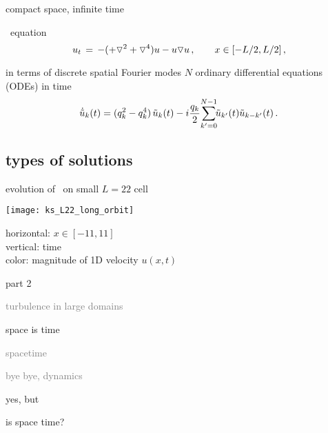 \begin{frame}{compact space, infinite time} %
\begin{block}{\KS\ equation}
\[
  u_t \,=\,
    -({\color{red}+}\triangledown^2 +{\color{red}\triangledown^4}) u
    - u \triangledown u
    \,,\qquad   x \in [-L/2,L/2]
    \,,
\]
\end{block}

\bigskip

\begin{block}{in terms of discrete spatial Fourier modes}
$N$ ordinary differential equations (ODEs) in time
\[
\dot{\Fu}_k(\zeit) = ( q_k^2 - q_k^4 )\, \Fu_k(\zeit)
- i \frac{q_k}{2} \!\sum_{k'=0}^{N-1} \!\!\Fu_{k'}(\zeit) \Fu_{k-k'}(\zeit)
\,.
\]
\end{block}
\end{frame}


\subsection{types of solutions}
\begin{frame}{evolution of \KS\ on small $L=22$ cell}
\begin{center}
  \texttt{[image: ks\_L22\_long\_orbit]}
\end{center}
horizontal: $x \in [-11,11]$
\\
vertical: time
\\
color: magnitude of 1D velocity $u(x,t)$
\end{frame}

\begin{frame}{part 2}
\begin{enumerate}
              \item
    \textcolor{gray}{\small
turbulence in large domains
        }
              \item
    {\Large
space is time
    }\textcolor{gray}{\small
              \item
spacetime
              \item
bye bye, dynamics
                    }
            \end{enumerate}
\end{frame}

\begin{frame}{yes, but}
\begin{center}
{\huge is space time?}
\end{center}
\end{frame}

